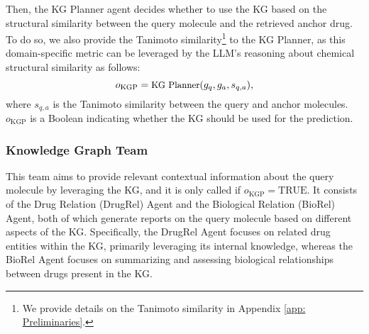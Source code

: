 Then, the KG Planner agent decides whether to use the KG based on the structural similarity between the query molecule and the retrieved anchor drug.
To do so, we also provide the  Tanimoto similarity\footnote{We provide details on the Tanimoto similarity in Appendix \ref{app: Preliminaries}.}
to the KG Planner, as this domain-specific metric can be leveraged by  the LLM's reasoning about chemical structural similarity as follows:
\begin{equation} 
\small
    o_{\text{KGP}} = \text{KG Planner}(g_q, g_{a}, s_{q,a}),
\end{equation}
where $s_{q,a}$ is the Tanimoto similarity between the query and anchor molecules.
$o_{\text{KGP}}$ is a Boolean indicating whether the KG should be used for the prediction. %


\subsubsection{Knowledge Graph Team}
\label{sec:KnowledgeGraphTeam}

This team aims to provide relevant contextual information about the query molecule by leveraging the KG, and it is only called if $o_{\text{KGP}} = \text{TRUE}$. 
It consists of the Drug Relation (DrugRel) Agent and the Biological Relation (BioRel) Agent, both of which generate reports on the query molecule based on different aspects of the KG. 
Specifically, the DrugRel Agent focuses on related drug entities within the KG, primarily leveraging its internal knowledge, 
whereas the BioRel Agent focuses on summarizing and assessing biological relationships between drugs present in the KG.

